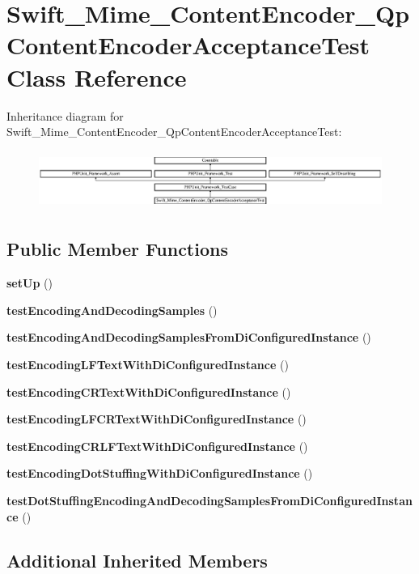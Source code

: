 \section{Swift\+\_\+\+Mime\+\_\+\+Content\+Encoder\+\_\+\+Qp\+Content\+Encoder\+Acceptance\+Test Class Reference}
\label{class_swift___mime___content_encoder___qp_content_encoder_acceptance_test}
Inheritance diagram for Swift\+\_\+\+Mime\+\_\+\+Content\+Encoder\+\_\+\+Qp\+Content\+Encoder\+Acceptance\+Test\+:\begin{figure}[H]
\begin{center}
\leavevmode
\includegraphics[height=1.924399cm]{class_swift___mime___content_encoder___qp_content_encoder_acceptance_test}
\end{center}
\end{figure}
\subsection*{Public Member Functions}
\begin{DoxyCompactItemize}
\item 
{\bf set\+Up} ()
\item 
{\bf test\+Encoding\+And\+Decoding\+Samples} ()
\item 
{\bf test\+Encoding\+And\+Decoding\+Samples\+From\+Di\+Configured\+Instance} ()
\item 
{\bf test\+Encoding\+L\+F\+Text\+With\+Di\+Configured\+Instance} ()
\item 
{\bf test\+Encoding\+C\+R\+Text\+With\+Di\+Configured\+Instance} ()
\item 
{\bf test\+Encoding\+L\+F\+C\+R\+Text\+With\+Di\+Configured\+Instance} ()
\item 
{\bf test\+Encoding\+C\+R\+L\+F\+Text\+With\+Di\+Configured\+Instance} ()
\item 
{\bf test\+Encoding\+Dot\+Stuffing\+With\+Di\+Configured\+Instance} ()
\item 
{\bf test\+Dot\+Stuffing\+Encoding\+And\+Decoding\+Samples\+From\+Di\+Configured\+Instance} ()
\end{DoxyCompactItemize}
\subsection*{Additional Inherited Members}


